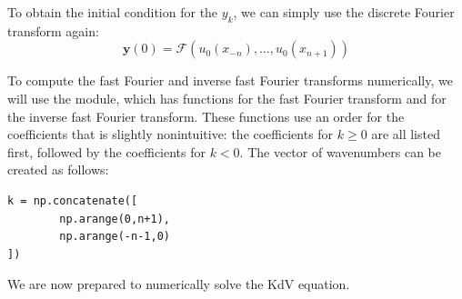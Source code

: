 To obtain the initial condition for the \(y_k\), we can simply use the discrete Fourier transform again:
\[
\mathbf{y}(0) = \mathcal{F}(u_0(x_{-n}),\ldots,u_0(x_{n+1}))
\]

To compute the fast Fourier and inverse fast Fourier transforms numerically, we will use the  module, which has functions  for the fast Fourier transform and  for the inverse fast Fourier transform.
These functions use an order for the coefficients that is slightly nonintuitive: the coefficients for \(k\geq 0\) are all listed first, followed by the coefficients for \(k<0\).
The vector of wavenumbers can be created as follows:
\begin{lstlisting}
k = np.concatenate([
        np.arange(0,n+1),
        np.arange(-n-1,0)
])
\end{lstlisting}
We are now prepared to numerically solve the KdV equation.


